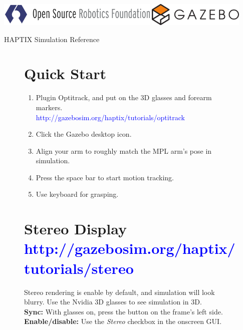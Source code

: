 \documentclass[11pt, letterpaper, landscape]{article}
\begin{document}
\clearpage
\thispagestyle{empty}
\pagestyle{empty}
\small
\includegraphics[height=3.0em]{osrf-pos-horz-pms5265}
\hspace{0.51\textwidth}%
\includegraphics[height=3.0em]{gazebo.pdf}

\begin{center}
{\LARGE HAPTIX Simulation Reference}%
\end{center}

\begin{figure}[!htb]
  \centering
  \begin{minipage}[t]{0.48\textwidth}
    \begin{tcolorbox}[height=6.5cm,colback=gray!8,colframe=gray!15]
      \section*{Quick Start}
      \begin{enumerate}
        \item Plugin Optitrack, and put on the 3D glasses and forearm markers.\\
          \textcolor{blue}{http://gazebosim.org/haptix/tutorials/optitrack}
        \item Click the Gazebo desktop icon.
        \item Align your arm to roughly match the MPL arm's pose in simulation.
        \item Press the space bar to start motion tracking.
        \item Use keyboard for grasping.
      \end{enumerate}
    \end{tcolorbox}
  \end{minipage}%
  \hspace{0.02\textwidth}%
  \begin{minipage}[t]{0.48\textwidth}
    \begin{tcolorbox}[height=6.5cm,colback=gray!8,colframe=gray!15]
      \section*{Stereo Display \textcolor{blue}{\textnormal{\small http://gazebosim.org/haptix/tutorials/stereo}}}
      Stereo rendering is enable by default, and simulation will look blurry. Use the Nvidia 3D glasses to see simulation in 3D.\\

      {\bf Sync:} With glasses on, press the button on the frame's left side.\\
      {\bf Enable/disable:} Use the {\em Stereo} checkbox in the onscreen GUI.\\
    \end{tcolorbox}
  \end{minipage}
\end{figure}
\end{document}
